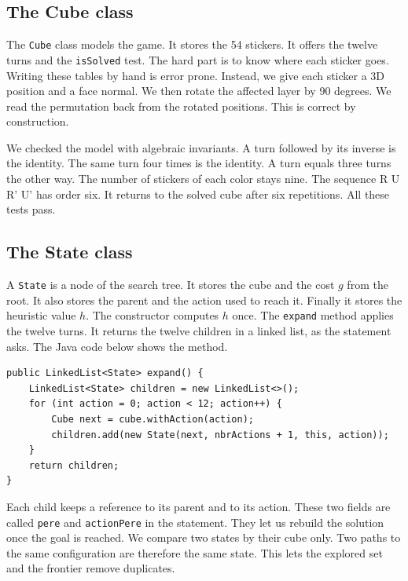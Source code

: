 \documentclass[11pt,a4paper]{article}
\begin{document}
\subsection{The Cube class}

The \texttt{Cube} class models the game. It stores the 54 stickers. It offers the
twelve turns and the \texttt{isSolved} test. The hard part is to know where each
sticker goes. Writing these tables by hand is error prone. Instead, we give each
sticker a 3D position and a face normal. We then rotate the affected layer by 90
degrees. We read the permutation back from the rotated positions. This is correct
by construction.

We checked the model with algebraic invariants. A turn followed by its inverse is
the identity. The same turn four times is the identity. A turn equals three turns
the other way. The number of stickers of each color stays nine. The sequence R U
R' U' has order six. It returns to the solved cube after six repetitions. All
these tests pass.

\subsection{The State class}

A \texttt{State} is a node of the search tree. It stores the cube and the cost $g$
from the root. It also stores the parent and the action used to reach it. Finally
it stores the heuristic value $h$. The constructor computes $h$ once. The
\texttt{expand} method applies the twelve turns. It returns the twelve children in
a linked list, as the statement asks. The Java code below shows the method.

\begin{lstlisting}
public LinkedList<State> expand() {
    LinkedList<State> children = new LinkedList<>();
    for (int action = 0; action < 12; action++) {
        Cube next = cube.withAction(action);
        children.add(new State(next, nbrActions + 1, this, action));
    }
    return children;
}
\end{lstlisting}

Each child keeps a reference to its parent and to its action. These two fields are
called \texttt{pere} and \texttt{actionPere} in the statement. They let us rebuild
the solution once the goal is reached. We compare two states by their cube only.
Two paths to the same configuration are therefore the same state. This lets the
explored set and the frontier remove duplicates.
\end{document}
